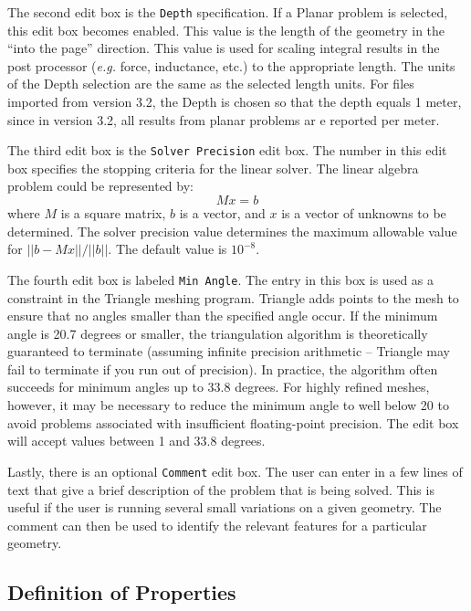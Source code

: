 \documentclass[12pt]{report}
\begin{document}
The second edit box is the {\tt Depth} specification.  If a Planar
problem is selected, this edit box becomes enabled.  This value is
the length of the geometry in the ``into the page'' direction.
This value is used for scaling integral results in the post
processor ({\em e.g.} force, inductance, etc.) to the appropriate
length.  The units of the Depth selection are the same as the
selected length units.  For files imported from version 3.2, the
Depth is chosen so that the depth equals 1 meter, since in version
3.2, all results from planar problems ar e reported per meter.

The third edit box is the {\tt Solver Precision} edit box. The number in this edit box
specifies the stopping criteria for the linear solver.  The linear algebra
problem could be represented by:
\begin{displaymath}
M x=b
\end{displaymath} where $M$ is a square matrix, $b$ is a vector, and $x$ is
a vector of unknowns to be determined.  The solver precision value
determines the maximum allowable value for $||b-M x||/||b||$.  The
default value is $10^{-8}$.

The fourth edit box is labeled {\tt Min Angle}.  The entry in this box is used as a
constraint in the Triangle meshing program.  Triangle adds points to the mesh to
ensure that no angles smaller than the specified angle occur. If the minimum angle
is 20.7 degrees or smaller, the triangulation algorithm is theoretically guaranteed to
terminate (assuming infinite precision arithmetic -- Triangle may
fail to terminate if you run out of precision).  In practice, the
algorithm often succeeds for minimum angles up to 33.8 degrees.
For highly refined meshes, however, it may be necessary to reduce
the minimum angle to well below 20 to avoid problems associated
with insufficient floating-point precision.  The edit box will accept
values between 1 and 33.8 degrees.


Lastly, there is an optional {\tt Comment} edit box.  The
user can enter in a few lines of text that give a brief description
of the problem that is being solved.  This is useful if the user is
running several small variations on a given geometry.  The comment
can then be used to identify the relevant features for a particular
geometry.





\subsection{Definition of Properties}
\end{document}
